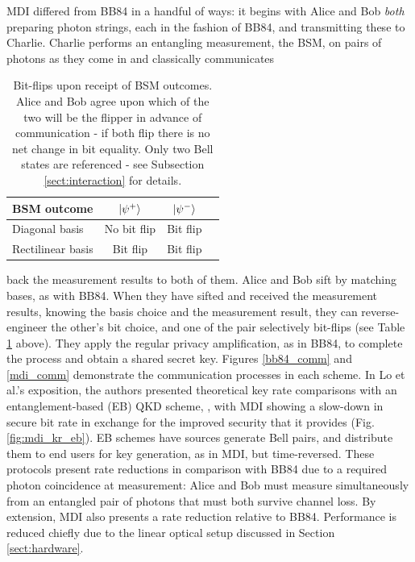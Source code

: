 \documentclass[9pt,technote]{IEEEtran}
\begin{document}
MDI differed from BB84 in a handful of ways: it begins with Alice and Bob \textit{both} preparing photon strings, each in the fashion of BB84, and transmitting these to Charlie. Charlie performs an entangling measurement, the BSM, on pairs of photons as they come in and classically communicates 
\begin{table}[h]
    \centering
    \begin{tabular*}{0.48\textwidth}{@{\extracolsep{\fill}}lccc}
        \toprule
        BSM outcome         & $\ket{\psi^{+}}$ & $\ket{\psi^{-}}$ \\
        \midrule
        Diagonal basis      & No bit flip & Bit flip \\
        Rectilinear basis   & Bit flip & Bit flip \\
        \bottomrule
    \end{tabular*}
    \caption{Bit-flips upon receipt of BSM outcomes. Alice and Bob agree upon which of the two will be the flipper in advance of communication - if both flip there is no net change in bit equality. Only two Bell states are referenced - see Subsection \ref{sect:interaction} for details.}
    \label{mdi_flips}
\end{table}
\noindent back the measurement results to both of them. Alice and Bob sift by matching bases, as with BB84. When they have sifted and received the measurement results, knowing the basis choice and the measurement result, they can reverse-engineer the other's bit choice, and one of the pair selectively bit-flips (see Table \ref{mdi_flips} above). They apply the regular privacy amplification, as in BB84, to complete the process and obtain a shared secret key. Figures \ref{bb84_comm} and \ref{mdi_comm} demonstrate the communication processes in each scheme. In Lo et al.'s exposition, the authors presented theoretical key rate comparisons with an entanglement-based (EB) QKD scheme, \cite{Ma_2007}, with MDI showing a slow-down in secure bit rate in exchange for the improved security that it provides (Fig. \ref{fig:mdi_kr_eb}). EB schemes have sources generate Bell pairs, and distribute them to end users for key generation, as in MDI, but time-reversed. These protocols present rate reductions in comparison with BB84 due to a required photon coincidence at measurement: Alice and Bob must measure simultaneously from an entangled pair of photons that must both survive channel loss. By extension, MDI also presents a rate reduction relative to BB84. Performance is reduced chiefly due to the linear optical setup discussed in Section \ref{sect:hardware}.
\end{document}

